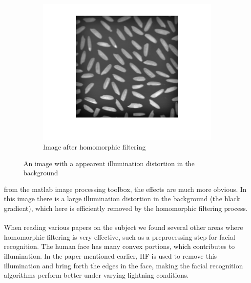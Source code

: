 \begin{figure}[h!]
\begin{subfigure}[b]{0.6\textwidth}
                \includegraphics[width=\textwidth]{pics/microbes_after.png}
                \caption{Image after homomorphic filtering}
                \label{fig:microbe_after}
        \end{subfigure}
        \caption{An image with a appearent illumination distortion in the background}	
        \label{fig:gamma_diff}
		\end{figure}
		from the matlab image processing toolbox, the effects are much more obvious. 
		In this image there is a large illumination
		distortion in the background (the black gradient), which here is efficiently 
		removed by the homomorphic filtering process. \\
		\\
		When reading various papers on the
		subject we found several other areas where homomorphic filtering is very effective,
		such as a preprocessing step for facial recognition. The human face has many convex
		portions, which contributes to illumination. In the paper mentioned earlier, HF
		is used to remove this illumination and bring forth the edges in the face, making
		the facial recognition algorithms perform better under varying lightning conditions.
%  
